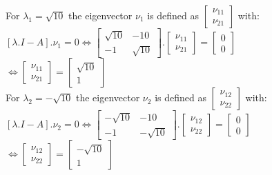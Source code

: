 \documentclass[14pt,a4paper]{article}
\begin{document}
\begin{enumerate}
	For $\lambda_1 = \sqrt{10}$ the eigenvector $\nu_1$ is defined as $\begin{bmatrix}\nu_{11}\\ \nu_{21} \end{bmatrix}$ with: \\
		$[\lambda .I - A].\nu_1 = 0 \Leftrightarrow \begin{bmatrix} \sqrt{10} & -10 \\ -1 & \sqrt{10} \end{bmatrix} .\begin{bmatrix}\nu_{11}\\ \nu_{21} \end{bmatrix} = \begin{bmatrix} 0\\0 \end{bmatrix} $ \\
		$ \Leftrightarrow \begin{bmatrix} \nu_{11} \\\nu_{21}	\end{bmatrix} = \begin{bmatrix} \sqrt{10} \\ 1	\end{bmatrix}$ \\
	
	For $\lambda_2 = -\sqrt{10}$ the eigenvector $\nu_2$ is defined as $\begin{bmatrix}\nu_{12}\\ \nu_{22} \end{bmatrix}$ with: \\
		$[\lambda .I - A].\nu_2 = 0 \Leftrightarrow \begin{bmatrix} -\sqrt{10} & -10 \\ -1 & -\sqrt{10} \end{bmatrix} .\begin{bmatrix}\nu_{12}\\ \nu_{22} \end{bmatrix} = \begin{bmatrix} 0\\0 \end{bmatrix} $ \\
		$ \Leftrightarrow \begin{bmatrix} \nu_{12} \\\nu_{22}	\end{bmatrix} = \begin{bmatrix} -\sqrt{10} \\ 1	\end{bmatrix}$ \\
	

\end{enumerate}
\end{document}
